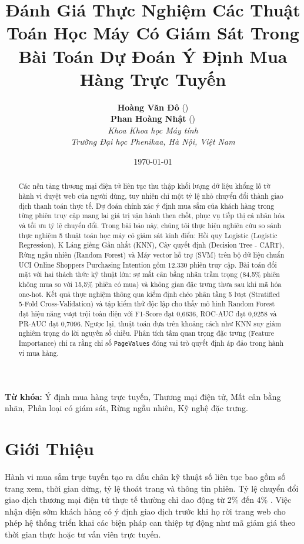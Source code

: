 \documentclass[11pt,a4paper]{article}
\title{\LARGE \textbf{\textcolor{primaryblue}{Đánh Giá Thực Nghiệm Các Thuật Toán Học Máy Có Giám Sát Trong Bài Toán Dự Đoán Ý Định Mua Hàng Trực Tuyến}}}
\author{
    \textbf{Hoàng Văn Đô} \quad (\text{MSSV: 24107948}) \\
    \textbf{Phan Hoàng Nhật} \quad (\text{MSSV: 24100092}) \\[1ex]
    \textit{Khoa Khoa học Máy tính} \\
    \textit{Trường Đại học Phenikaa, Hà Nội, Việt Nam}
}
\date{\today}
\begin{document}
\maketitle

\begin{abstract}
Các nền tảng thương mại điện tử liên tục thu thập khối lượng dữ liệu khổng lồ từ hành vi duyệt web của người dùng, tuy nhiên chỉ một tỷ lệ nhỏ chuyển đổi thành giao dịch thanh toán thực tế. Dự đoán chính xác ý định mua sắm của khách hàng trong từng phiên truy cập mang lại giá trị vận hành then chốt, phục vụ tiếp thị cá nhân hóa và tối ưu tỷ lệ chuyển đổi. Trong bài báo này, chúng tôi thực hiện nghiên cứu so sánh thực nghiệm 5 thuật toán học máy có giám sát kinh điển: Hồi quy Logistic (Logistic Regression), K Láng giềng Gần nhất (KNN), Cây quyết định (Decision Tree - CART), Rừng ngẫu nhiên (Random Forest) và Máy vector hỗ trợ (SVM) trên bộ dữ liệu chuẩn UCI Online Shoppers Purchasing Intention gồm 12.330 phiên truy cập. Bài toán đối mặt với hai thách thức kỹ thuật lớn: sự mất cân bằng nhãn trầm trọng (84,5\% phiên không mua so với 15,5\% phiên có mua) và không gian đặc trưng thưa sau khi mã hóa one-hot. Kết quả thực nghiệm thông qua kiểm định chéo phân tầng 5 lượt (Stratified 5-Fold Cross-Validation) và tập kiểm thử độc lập cho thấy mô hình Random Forest đạt hiệu năng vượt trội toàn diện với F1-Score đạt 0,6636, ROC-AUC đạt 0,9258 và PR-AUC đạt 0,7096. Ngược lại, thuật toán dựa trên khoảng cách như KNN suy giảm nghiêm trọng do lời nguyền số chiều. Phân tích tầm quan trọng đặc trưng (Feature Importance) chỉ ra rằng chỉ số \texttt{PageValues} đóng vai trò quyết định áp đảo trong hành vi mua hàng.
\end{abstract}

\noindent \textbf{Từ khóa:} Ý định mua hàng trực tuyến, Thương mại điện tử, Mất cân bằng nhãn, Phân loại có giám sát, Rừng ngẫu nhiên, Kỹ nghệ đặc trưng.

\section{Giới Thiệu}
Hành vi mua sắm trực tuyến tạo ra dấu chân kỹ thuật số liên tục bao gồm số trang xem, thời gian dừng, tỷ lệ thoát trang và thông tin phiên. Tỷ lệ chuyển đổi giao dịch thương mại điện tử thực tế thường chỉ dao động từ 2\% đến 4\% \cite{sakar2019real}. Việc nhận diện sớm khách hàng có ý định giao dịch trước khi họ rời trang web cho phép hệ thống triển khai các biện pháp can thiệp tự động như mã giảm giá theo thời gian thực hoặc tư vấn viên trực tuyến.
\end{document}
